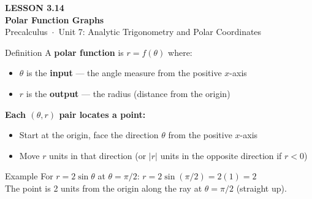 \documentclass[aspectratio=169, 11pt]{beamer}
\begin{document}
{
\begin{frame}[plain]
  \vspace{2.8cm}\hspace{0.55cm}%
  \begin{minipage}{0.9\textwidth}
    {\color{goldacc}\bfseries\small LESSON 3.14}\\[0.5cm]
    {\color{white}\bfseries\LARGE Polar Function Graphs}\\[1.2cm]
    {\color{skymid}\small Precalculus~$\cdot$~Unit 7: Analytic Trigonometry and Polar Coordinates}
  \end{minipage}
\end{frame}
}

\begin{frame}[t, plain]

  \begin{block}{Definition}
    A \textbf{polar function} is $r = f(\theta)$ where:
    \begin{itemize}
      \item $\theta$ is the \textbf{input} --- the angle measure from the positive $x$-axis
      \item $r$ is the \textbf{output} --- the radius (distance from the origin)
    \end{itemize}
  \end{block}

  \vspace{0.4cm}
  \textbf{Each $(\theta, r)$ pair locates a point:}
  \begin{itemize}
    \item Start at the origin, face the direction $\theta$ from the positive $x$-axis
    \item Move $r$ units in that direction (or $|r|$ units in the opposite direction if $r < 0$)
  \end{itemize}

  \vspace{0.4cm}
  \begin{block}{Example}
    For $r = 2\sin\theta$ at $\theta = \pi/2$: \quad $r = 2\sin(\pi/2) = 2(1) = 2$\\
    The point is 2 units from the origin along the ray at $\theta = \pi/2$ (straight up).
  \end{block}
\end{frame}
\end{document}
